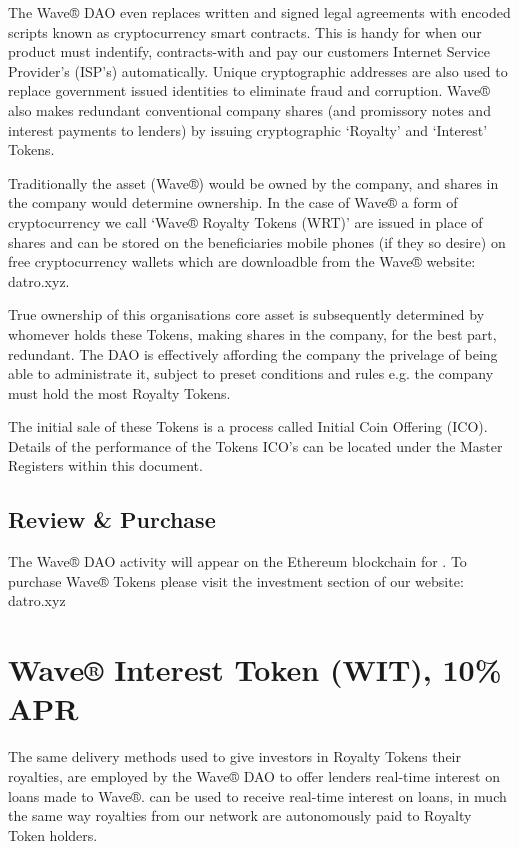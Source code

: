 \documentclass[letterpaper,10pt,openany,oneside,english]{sphinxmanual}
\begin{document}
The Wave® DAO even replaces written and signed legal agreements with encoded scripts known as cryptocurrency smart contracts.
This is handy for when our product must indentify, contracts-with and pay our customers Internet Service Provider’s (ISP’s) automatically.
Unique cryptographic addresses are also used to replace government issued identities to eliminate fraud and corruption.
Wave® also makes redundant conventional company shares (and promissory notes and interest payments to lenders) by issuing cryptographic ‘Royalty’ and ‘Interest’ Tokens.

Traditionally the asset (Wave®) would be owned by the company, and shares in the company would determine ownership.
In the case of Wave® a form of cryptocurrency we call ‘Wave® Royalty Tokens (WRT)’ are issued in place of shares and can be stored on the beneficiaries mobile phones (if they so desire) on free cryptocurrency wallets which are downloadble from the Wave®  website: datro.xyz.

True ownership of this organisations core asset is subsequently determined by whomever holds these Tokens, making shares in the company, for the best part, redundant.
The DAO is effectively affording the company the privelage of being able to administrate it, subject to preset conditions and rules e.g. the company must hold the most Royalty Tokens.

The initial sale of these Tokens is a process called Initial Coin Offering (ICO).
Details of the performance of the Tokens ICO’s can be located under the Master Registers within this document.


\section{Review \& Purchase}
\label{\detokenize{introduction:review-purchase}}
The Wave® DAO activity will appear on the Ethereum blockchain for .
To purchase Wave® Tokens please visit the investment section of our website: datro.xyz


\chapter{Wave® Interest Token (WIT), 10\% APR}
\label{\detokenize{wit-summary:wave-interest-token-wit-10-apr}}\label{\detokenize{wit-summary::doc}}
The same delivery methods used to give investors in Royalty Tokens their royalties, are employed by the Wave® DAO to offer lenders real-time interest on loans made to Wave®.
 can be used to receive real-time interest on loans, in much the same way royalties from our network are autonomously paid to Royalty Token holders.
\end{document}
